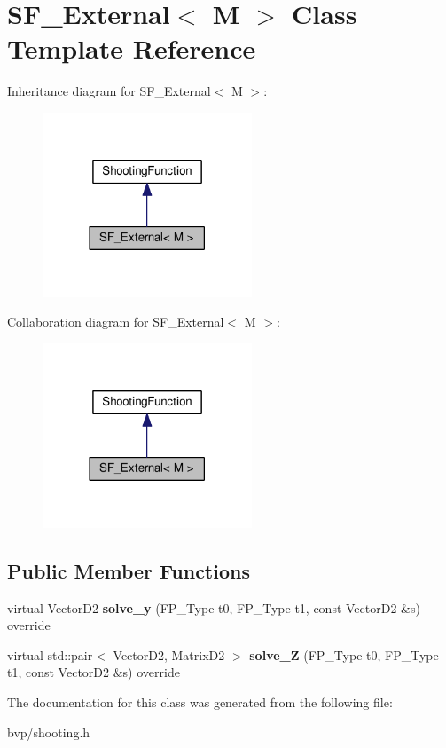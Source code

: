 \hypertarget{classSF__External}{}\section{S\+F\+\_\+\+External$<$ M $>$ Class Template Reference}
\label{classSF__External}


Inheritance diagram for S\+F\+\_\+\+External$<$ M $>$\+:\nopagebreak
\begin{figure}[H]
\begin{center}
\leavevmode
\includegraphics[width=177pt]{classSF__External__inherit__graph}
\end{center}
\end{figure}


Collaboration diagram for S\+F\+\_\+\+External$<$ M $>$\+:\nopagebreak
\begin{figure}[H]
\begin{center}
\leavevmode
\includegraphics[width=177pt]{classSF__External__coll__graph}
\end{center}
\end{figure}
\subsection*{Public Member Functions}
\begin{DoxyCompactItemize}
\item 
\mbox{\label{classSF__External_a4c59ab31f0bb2ab9663b5137655a6266}} 
virtual Vector\+D2 {\bfseries solve\+\_\+y} (F\+P\+\_\+\+Type t0, F\+P\+\_\+\+Type t1, const Vector\+D2 \&s) override
\item 
\mbox{\label{classSF__External_a72c762001bc0a4bc43ac82aba45ad3ba}} 
virtual std\+::pair$<$ Vector\+D2, Matrix\+D2 $>$ {\bfseries solve\+\_\+Z} (F\+P\+\_\+\+Type t0, F\+P\+\_\+\+Type t1, const Vector\+D2 \&s) override
\end{DoxyCompactItemize}


The documentation for this class was generated from the following file\+:\begin{DoxyCompactItemize}
\item 
bvp/shooting.\+h\end{DoxyCompactItemize}
